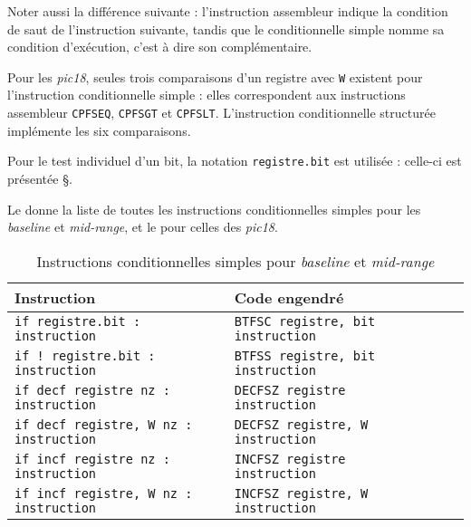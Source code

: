 Noter aussi la différence suivante : l'instruction assembleur indique la condition de saut de l'instruction suivante, tandis que le conditionnelle simple nomme sa condition d'exécution, c'est à dire son complémentaire.

Pour les \emph{pic18}, seules trois comparaisons d'un registre avec \texttt{W} existent pour l'instruction conditionnelle simple : elles correspondent aux instructions assembleur \texttt{CPFSEQ}, \texttt{CPFSGT} et \texttt{CPFSLT}. L'instruction conditionnelle structurée implémente les six comparaisons.

Pour le test individuel d'un bit, la notation \texttt{registre.bit} est utilisée : celle-ci est présentée §.

Le  donne la liste de toutes les instructions conditionnelles simples pour les \emph{baseline} et \emph{mid-range}, et le  pour celles des \emph{pic18}.

\begin{table}[!ht]
  \centering
  \small
  \begin{tabular}{lp{4cm}lll}
    \textbf{Instruction} & \textbf{Code engendré}\\
    \hline
    \texttt{if registre.bit : instruction} & \texttt{BTFSC registre, bit instruction} \\
    \texttt{if ! registre.bit : instruction} & \texttt{BTFSS registre, bit instruction} \\
    \texttt{if decf registre nz : instruction} & \texttt{DECFSZ registre instruction} \\
    \texttt{if decf registre, W nz : instruction} & \texttt{DECFSZ registre, W instruction} \\
    \texttt{if incf registre nz : instruction} & \texttt{INCFSZ registre instruction} \\
    \texttt{if incf registre, W nz : instruction} & \texttt{INCFSZ registre, W instruction} \\
    \hline
  \end{tabular}
  \caption{Instructions conditionnelles simples pour \emph{baseline} et \emph{mid-range}}
\end{table}

